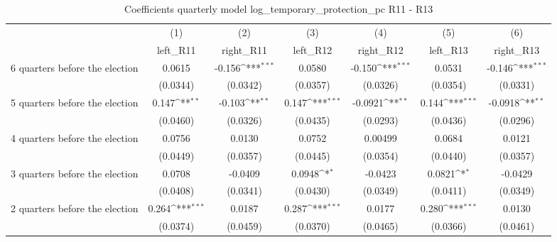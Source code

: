 \begin{table}[htbp]\centering
\def\sym#1{\ifmmode^{#1}\else\(^{#1}\)\fi}
\caption{Coefficients quarterly model log\_temporary\_protection\_pc R11 - R13}
\begin{tabular}{l*{6}{c}}
\hline\hline
                    &\multicolumn{1}{c}{(1)}&\multicolumn{1}{c}{(2)}&\multicolumn{1}{c}{(3)}&\multicolumn{1}{c}{(4)}&\multicolumn{1}{c}{(5)}&\multicolumn{1}{c}{(6)}\\
                    &\multicolumn{1}{c}{left\_R11}&\multicolumn{1}{c}{right\_R11}&\multicolumn{1}{c}{left\_R12}&\multicolumn{1}{c}{right\_R12}&\multicolumn{1}{c}{left\_R13}&\multicolumn{1}{c}{right\_R13}\\
\hline
 6 quarters before the election&      0.0615         &      -0.156\sym{***}&      0.0580         &      -0.150\sym{***}&      0.0531         &      -0.146\sym{***}\\
                    &    (0.0344)         &    (0.0342)         &    (0.0357)         &    (0.0326)         &    (0.0354)         &    (0.0331)         \\
[1em]
 5 quarters before the election&       0.147\sym{**} &      -0.103\sym{**} &       0.147\sym{***}&     -0.0921\sym{**} &       0.144\sym{***}&     -0.0918\sym{**} \\
                    &    (0.0460)         &    (0.0326)         &    (0.0435)         &    (0.0293)         &    (0.0436)         &    (0.0296)         \\
[1em]
 4 quarters before the election&      0.0756         &      0.0130         &      0.0752         &     0.00499         &      0.0684         &      0.0121         \\
                    &    (0.0449)         &    (0.0357)         &    (0.0445)         &    (0.0354)         &    (0.0440)         &    (0.0357)         \\
[1em]
 3 quarters before the election&      0.0708         &     -0.0409         &      0.0948\sym{*}  &     -0.0423         &      0.0821\sym{*}  &     -0.0429         \\
                    &    (0.0408)         &    (0.0341)         &    (0.0430)         &    (0.0349)         &    (0.0411)         &    (0.0349)         \\
[1em]
 2 quarters before the election&       0.264\sym{***}&      0.0187         &       0.287\sym{***}&      0.0177         &       0.280\sym{***}&      0.0130         \\
                    &    (0.0374)         &    (0.0459)         &    (0.0370)         &    (0.0465)         &    (0.0366)         &    (0.0461)         \\

\end{tabular}
\end{table}
